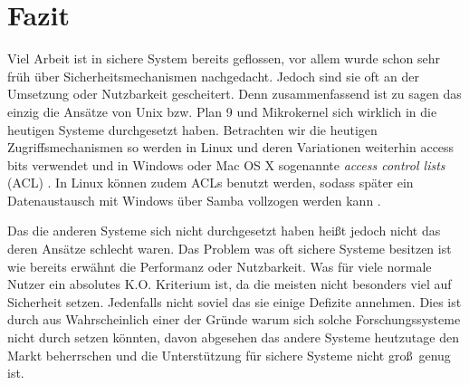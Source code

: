 \documentclass[11pt,technote]{IEEEtran}
\begin{document}
     
  \section{Fazit}
    Viel Arbeit ist in sichere System bereits geflossen, vor allem wurde schon sehr fr\"uh \"uber Sicherheitsmechanismen nachgedacht.
    Jedoch sind sie oft an der Umsetzung oder Nutzbarkeit gescheitert. Denn zusammenfassend ist zu sagen das einzig die Ans\"atze von Unix bzw. Plan
    9 und Mikrokernel sich wirklich in die heutigen Systeme durchgesetzt haben. Betrachten wir die heutigen Zugriffsmechanismen so werden in Linux 
    und deren Variationen weiterhin access bits verwendet und in Windows oder Mac OS X sogenannte \textit{access control lists} (ACL)
    \cite{Url:windows:acl, Url:macosx:acl}. In Linux k\"onnen zudem ACLs benutzt werden, sodass sp\"ater ein Datenaustausch mit Windows \"uber
    Samba vollzogen werden kann \cite{Url:linux:acl}.    
    
    Das die anderen Systeme sich nicht durchgesetzt haben hei\ss t jedoch nicht das deren Ans\"atze schlecht waren.
    Das Problem was oft sichere Systeme besitzen ist wie bereits erw\"ahnt die Performanz oder Nutzbarkeit. Was f\"ur 
    viele normale Nutzer ein absolutes K.O. Kriterium ist, da die meisten nicht besonders viel auf Sicherheit setzen.
    Jedenfalls nicht soviel das sie einige Defizite annehmen. Dies ist durch aus Wahrscheinlich einer der Gr\"unde warum sich solche
    Forschungssysteme nicht durch setzen k\"onnten, davon abgesehen das andere Systeme heutzutage den Markt beherrschen und
    die Unterst\"utzung f\"ur sichere Systeme nicht gro\ss\ genug ist.   
    
    


\end{document}
